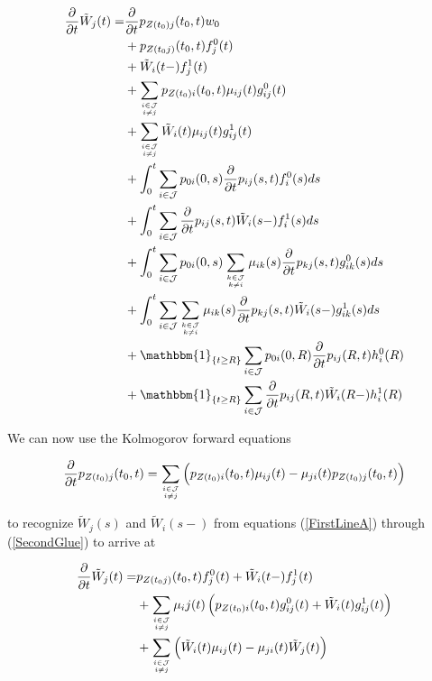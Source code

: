 \documentclass{book}
\newcommand{\1}[1]{\mathbbm{1}_{\left\lbrace #1 \right\rbrace}}
\theoremstyle{break}
\theoremstyle{remark}
\numberwithin{equation}{section}
\begin{document}
\begin{align*}
\frac{\partial}{\partial t} \tilde{W}_j(t) =& \frac{\partial}{\partial t} p_{Z(t_0)j}(t_0,t) w_0 \\
&+ p_{Z(t_0j)}(t_0,t) f_j^0(t) \\
&+ \tilde{W}_i(t-) f_j^1(t) \\
&+ \sum_{i \in \mathcal{J} \atop i \neq j} p_{Z(t_0)i}(t_0,t) \mu_{ij}(t) g_{ij}^0(t) \\
&+ \sum_{i \in \mathcal{J} \atop i \neq j} \tilde{W}_i(t) \mu_{ij}(t) g_{ij}^1(t) \\
&+ \int_0^t \sum_{i \in \mathcal{J}} p_{0i}(0,s) \frac{\partial}{\partial t} p_{ij}(s,t) f_i^0(s) ds \\
&+ \int_0^t \sum_{i \in \mathcal{J}} \frac{\partial}{\partial t} p_{ij}(s,t) \tilde{W}_i(s-) f_i^1(s) ds \\
&+ \int_0^t \sum_{i \in \mathcal{J}} p_{0i}(0,s) \sum_{k \in \mathcal{J} \atop k \neq i} \mu_{ik}(s) \frac{\partial}{\partial t} p_{kj}(s,t) g_{ik}^0(s) ds \\
&+ \int_0^t \sum_{i \in \mathcal{J}} \sum_{k \in \mathcal{J} \atop k \neq i} \mu_{ik}(s) \frac{\partial}{\partial t} p_{kj}(s,t) \tilde{W}_i(s-) g_{ik}^1(s) ds \\
&+ \1{t \geq R}\sum_{i \in \mathcal{J}} p_{0i}(0,R) \frac{\partial}{\partial t} p_{ij}(R,t) h_i^0(R) \\
&+ \1{t \geq R}\sum_{i \in \mathcal{J}} \frac{\partial}{\partial t} p_{ij}(R,t) \tilde{W}_i(R-) h_i^1(R)
\end{align*}

We can now use the Kolmogorov forward equations

\begin{align*}
\frac{\partial}{\partial t} p_{Z(t_0)j}(t_0,t) = \sum_{i \in \mathcal{J} \atop i \neq j} \left( p_{Z(t_0)i}(t_0,t) \mu_{ij}(t) - \mu_{ji}(t) p_{Z(t_0)j}(t_0,t) \right)
\end{align*}

to recognize $\tilde{W}_j(s)$ and $\tilde{W}_i(s-)$ from equations (\ref{FirstLineA}) through (\ref{SecondGlue}) to arrive at

\begin{align*}
	\frac{\partial}{\partial t} \tilde{W}_j(t) =& p_{Z(t_0j)}(t_0,t) f_j^0(t) + \tilde{W}_i(t-) f_j^1(t) \\
	&+ \sum_{i \in \mathcal{J} \atop i \neq j} \mu_ij(t) \left( p_{Z(t_0)i}(t_0,t) g_{ij}^0(t) + \tilde{W}_i(t) g_{ij}^1(t) \right) \\
	&+ \sum_{i \in \mathcal{J} \atop i \neq j} \left( \tilde{W}_i(t) \mu_{ij}(t) - \mu_{ji}(t) \tilde{W}_j(t) \right)
\end{align*}
\end{document}
